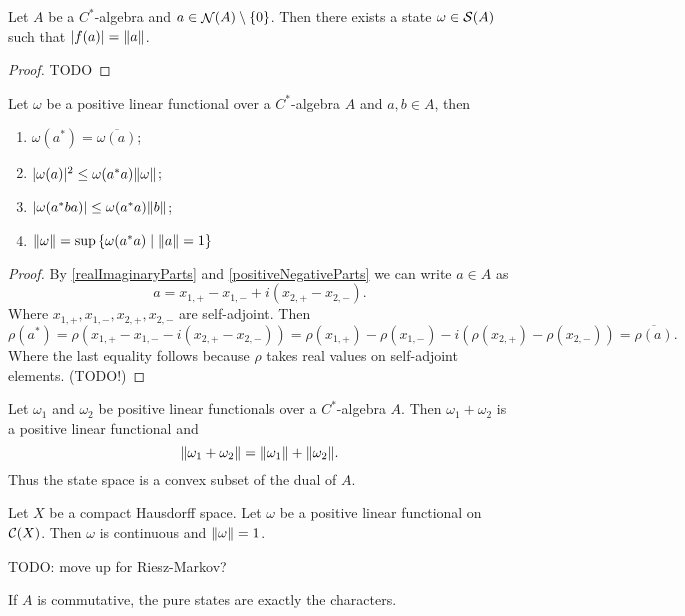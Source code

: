 \begin{lemma} \label{normalElementExtendsToState}
Let $A$ be a $C^*$-algebra and $a\in \mathop{\mathcal{N}}\nolimits(A)\setminus\{0\}$. Then there exists a state $\omega\in \operatorname{\mathcal{S}}(A)$ such that $|f(a)| = \lVert a\rVert$.
\end{lemma}
\begin{proof}
TODO
\end{proof}

\begin{proposition}
Let $\omega$ be a positive linear functional over a $C^*$-algebra $A$ and $a,b\in A$, then
\begin{enumerate}
\item $\omega(a^*) = \overline{\omega(a)}$;
\item $|\omega(a)|^2 \leq \omega(a^*a)\lVert\omega\rVert$;
\item $|\omega(a^*ba)| \leq \omega(a^*a)\lVert b\rVert$;
\item $\norm{\omega} = \sup\setbuilder{\omega(a^*a)}{\norm{a} = 1}$
\end{enumerate}
\end{proposition}
\begin{proof}
By \ref{realImaginaryParts} and \ref{positiveNegativeParts} we can write $a\in A$ as
\[ a = x_{1,+} - x_{1,-} + i(x_{2,+} - x_{2,-}).\]
Where $x_{1,+}, x_{1,-}, x_{2,+}, x_{2,-}$ are self-adjoint. Then
\[ \rho(a^*) = \rho(x_{1,+} - x_{1,-} - i(x_{2,+} - x_{2,-})) = \rho(x_{1,+}) - \rho(x_{1,-}) - i(\rho(x_{2,+}) - \rho(x_{2,-})) = \overline{\rho(a)}. \]
Where the last equality follows because $\rho$ takes real values on self-adjoint elements. (TODO!)
\end{proof}
\begin{corollary}
Let $\omega_1$ and $\omega_2$ be positive linear functionals over a $C^*$-algebra $A$. Then $\omega_1+\omega_2$ is a positive linear functional and
\[ \lVert\omega_1+\omega_2\rVert = \lVert\omega_1\rVert + \lVert\omega_2\rVert. \]
Thus the state space is a convex subset of the dual of $A$.
\end{corollary}
\begin{corollary}
Let $X$ be a compact Hausdorff space. Let $\omega$ be a positive linear functional on $\operatorname{\mathcal{C}}(X)$. Then $\omega$ is continuous and $\lVert\omega\rVert = 1$.
\end{corollary}
TODO: move up for Riesz-Markov?

\begin{proposition}
If $A$ is commutative, the pure states are exactly the characters.
\end{proposition}

